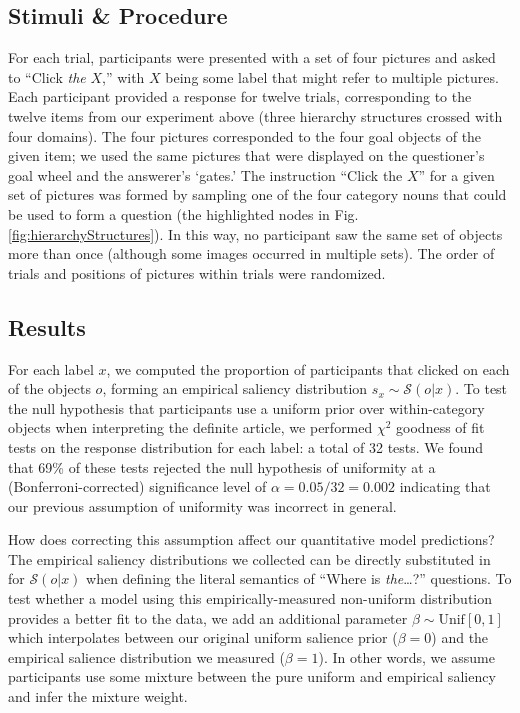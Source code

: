 \documentclass[12pt, floatsintext, jou]{apa6}
\begin{document}
\subsection{Stimuli \& Procedure}
For each trial, participants were presented with a set of four pictures and asked to ``Click \emph{the} $X$,'' with $X$ being some label that might refer to multiple pictures. Each participant provided a response for twelve trials, corresponding to the twelve items from our experiment above (three hierarchy structures crossed with four domains). The four pictures corresponded to the four goal objects of the given item; we used the same pictures that were displayed on the questioner's goal wheel and the answerer's `gates.' The instruction ``Click the $X$'' for a given set of pictures was formed by sampling one of the four category nouns that could be used to form a question (the highlighted nodes in Fig. \ref{fig:hierarchyStructures}). In this way, no participant saw the same set of objects more than once (although some images occurred in multiple sets). The order of trials and positions of pictures within trials were randomized.

\subsection{Results}

For each label $x$, we computed the proportion of participants that clicked on each of the objects $o$, forming an empirical saliency distribution $s_x \sim \mathcal{S}(o | x)$. To test the null hypothesis that participants use a uniform prior over within-category objects when interpreting the definite article, we performed $\chi^2$ goodness of fit tests on the response distribution for each label: a total of 32 tests. We found that 69\% of these tests rejected the null hypothesis of uniformity at a (Bonferroni-corrected) significance level of $\alpha = 0.05/32 = 0.002$ indicating that our previous assumption of uniformity was incorrect in general. 

How does correcting this assumption affect our quantitative model predictions? The empirical saliency distributions we collected can be directly substituted in for $\mathcal{S}(o|x)$ when defining the literal semantics of ``Where is \emph{the}\dots?'' questions. To test whether a model using this empirically-measured non-uniform distribution provides a better fit to the data, we add an additional parameter $\beta \sim \textrm{Unif}[0,1]$ which interpolates between our original uniform salience prior ($\beta = 0$) and the empirical salience distribution we measured ($\beta = 1$). In other words, we assume participants use some mixture between the pure uniform and empirical saliency and infer the mixture weight.
\end{document}
